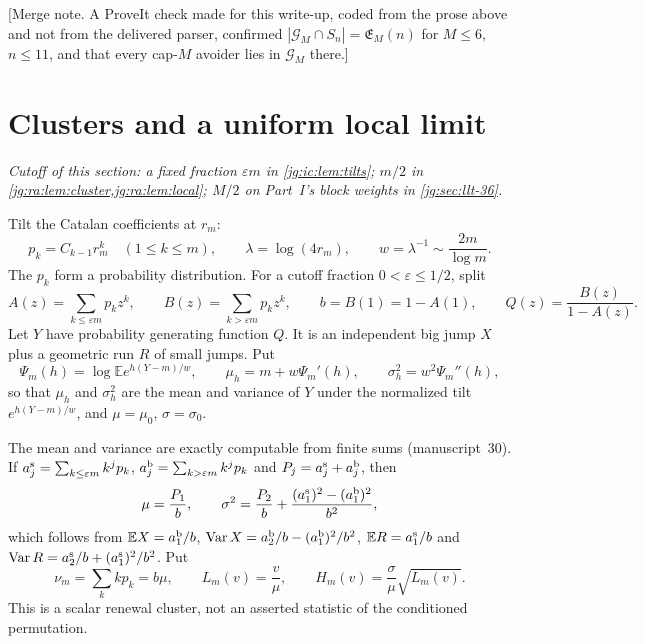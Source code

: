 \documentclass[11pt,a4paper]{article}
\theoremstyle{definition}\newaliascnt{definition}{theorem}
\theoremstyle{remark}\newaliascnt{remark}{theorem}
\newcommand{\ljE}{\mathbb E}
\begin{document}
[Merge note. A ProveIt check made for this write-up, coded from the prose above
and not from the delivered parser, confirmed $|\mathcal G_M\cap
S_n|=\mathfrak E_M(n)$ for $M\le6$, $n\le11$, and that every cap-$M$ avoider
lies in $\mathcal G_M$ there.]

\section{Clusters and a uniform local limit}
\label{jg:sec:llt}
\emph{Cutoff of this section: a fixed fraction $\varepsilon m$ in
\cref{jg:ic:lem:tilts}; $m/2$ in \cref{jg:ra:lem:cluster,jg:ra:lem:local};
$M/2$ on Part~I's block weights in \cref{jg:sec:llt-36}.}

Tilt the Catalan coefficients at $r_m$:
\[
 p_k=C_{k-1}r_m^k\quad(1\le k\le m),\qquad
 \lambda=\log(4r_m),\qquad w=\lambda^{-1}\sim\frac{2m}{\log m}.
\]
The $p_k$ form a probability distribution. For a cutoff fraction
$0<\varepsilon\le1/2$, split
\begin{equation}\label{jg:ra:eq:split}
 A(z)=\sum_{k\le\varepsilon m}p_kz^k,\qquad
 B(z)=\sum_{k>\varepsilon m}p_kz^k,\qquad
 b=B(1)=1-A(1),\qquad Q(z)=\frac{B(z)}{1-A(z)}.
\end{equation}
Let $Y$ have probability generating function $Q$. It is an independent big
jump $X$ plus a geometric run $R$ of small jumps. Put
\[
 \Psi_m(h)=\log\ljE e^{h(Y-m)/w},\qquad
 \mu_h=m+w\Psi_m'(h),\qquad \sigma_h^2=w^2\Psi_m''(h),
\]
so that $\mu_h$ and $\sigma_h^2$ are the mean and variance of $Y$ under the
normalized tilt $e^{h(Y-m)/w}$, and $\mu=\mu_0$, $\sigma=\sigma_0$.

The mean and variance are exactly computable from finite sums
(manuscript~30). If $a^{\rm s}_j=\sum_{k\le\varepsilon m}k^jp_k$,
$a^{\rm b}_j=\sum_{k>\varepsilon m}k^jp_k$ and $P_j=a^{\rm s}_j+a^{\rm b}_j$,
then
\begin{equation}\label{jg:tb:eq:finite}
 \mu=\frac{P_1}{b},\qquad
 \sigma^2=\frac{P_2}{b}+\frac{(a^{\rm s}_1)^2-(a^{\rm b}_1)^2}{b^2},
\end{equation}
which follows from $\ljE X=a^{\rm b}_1/b$,
$\operatorname{Var}X=a^{\rm b}_2/b-(a^{\rm b}_1)^2/b^2$, $\ljE R=a^{\rm s}_1/b$
and $\operatorname{Var}R=a^{\rm s}_2/b+(a^{\rm s}_1)^2/b^2$. Put
\begin{equation}\label{jg:tb:eq:phase}
 \nu_m=\sum_k kp_k=b\mu,\qquad
 L_m(v)=\frac v{\mu},\qquad
 H_m(v)=\frac{\sigma}{\mu}\sqrt{L_m(v)}.
\end{equation}
This is a scalar renewal cluster, not an asserted statistic of the conditioned
permutation.
\end{document}
